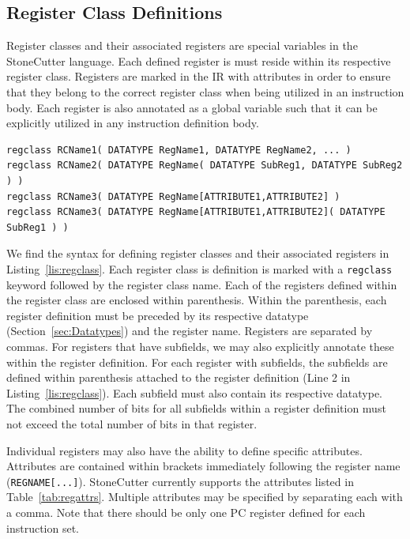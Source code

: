 \documentclass{article}
\begin{document}
\clearpage
\subsection{Register Class Definitions}
\label{sec:RegClassDef}

Register classes and their associated registers are special variables in the StoneCutter language.  Each defined register 
is must reside within its respective register class.  Registers are marked in the IR with attributes in order to ensure that 
they belong to the correct register class when being utilized in an instruction body.  Each register is also annotated as a global 
variable such that it can be explicitly utilized in any instruction definition body.

\vspace{0.125in}
\begin{lstlisting}[frame=single,style=base,caption={Register Class Definition Syntax},captionpos=b,label={lis:regclass}]
regclass RCName1( DATATYPE RegName1, DATATYPE RegName2, ... )
regclass RCName2( DATATYPE RegName( DATATYPE SubReg1, DATATYPE SubReg2 ) )
regclass RCName3( DATATYPE RegName[ATTRIBUTE1,ATTRIBUTE2] )
regclass RCName3( DATATYPE RegName[ATTRIBUTE1,ATTRIBUTE2]( DATATYPE SubReg1 ) )
\end{lstlisting}

We find the syntax for defining register classes and their associated registers in Listing~\ref{lis:regclass}.  Each register 
class is definition is marked with a \texttt{regclass} keyword followed by the register class name.  Each of the registers 
defined within the register class are enclosed within parenthesis.  Within the parenthesis, each register definition must 
be preceded by its respective datatype (Section~\ref{sec:Datatypes}) and the register name.  Registers are separated 
by commas.  For registers that have subfields, we may also explicitly annotate these within the register definition.  For 
each register with subfields, the subfields are defined within parenthesis attached to the register definition 
(Line 2 in Listing~\ref{lis:regclass}).  Each subfield must also contain its respective datatype.  The combined number of bits for 
all subfields within a register definition must not exceed the total number of bits in that register.  

Individual registers may also have the ability to define specific attributes.  Attributes are contained within brackets immediately 
following the register name (\texttt{REGNAME[...]}).  StoneCutter currently supports the attributes listed in Table~\ref{tab:regattrs}.  Multiple attributes may be specified by separating each with a comma.  Note that there should be only one PC register defined for each instruction 
set.
\end{document}
